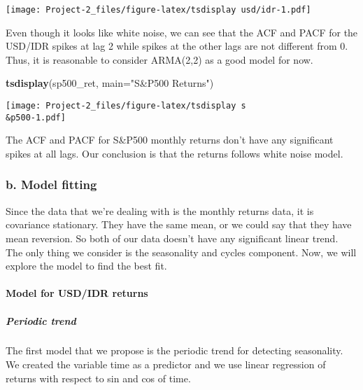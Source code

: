 \documentclass[]{article}
\newenvironment{Shaded}{\begin{snugshade}}{\end{snugshade}}
\newcommand{\KeywordTok}[1]{\textcolor[rgb]{0.13,0.29,0.53}{\textbf{#1}}}
\newcommand{\DataTypeTok}[1]{\textcolor[rgb]{0.13,0.29,0.53}{#1}}
\newcommand{\StringTok}[1]{\textcolor[rgb]{0.31,0.60,0.02}{#1}}
\newcommand{\NormalTok}[1]{#1}
\let\oldparagraph\paragraph
\renewcommand{\paragraph}[1]{\oldparagraph{#1}\mbox{}}
\let\oldsubparagraph\subparagraph
\renewcommand{\subparagraph}[1]{\oldsubparagraph{#1}\mbox{}}
\begin{document}
\texttt{[image: Project-2\_files/figure-latex/tsdisplay usd/idr-1.pdf]}

Even though it looks like white noise, we can see that the ACF and PACF
for the USD/IDR spikes at lag 2 while spikes at the other lags are not
different from 0. Thus, it is reasonable to consider ARMA(2,2) as a good
model for now.

\begin{Shaded}
\begin{Highlighting}[]
\KeywordTok{tsdisplay}\NormalTok{(sp500_ret, }\DataTypeTok{main=}\StringTok{"S&P500 Returns"}\NormalTok{)}
\end{Highlighting}
\end{Shaded}

\texttt{[image: Project-2\_files/figure-latex/tsdisplay s\\\&p500-1.pdf]}

The ACF and PACF for S\&P500 monthly returns don't have any significant
spikes at all lags. Our conclusion is that the returns follows white
noise model.

\subsubsection{b. Model fitting}\label{b.-model-fitting}

Since the data that we're dealing with is the monthly returns data, it
is covariance stationary. They have the same mean, or we could say that
they have mean reversion. So both of our data doesn't have any
significant linear trend. The only thing we consider is the seasonality
and cycles component. Now, we will explore the model to find the best
fit.

\paragraph{Model for USD/IDR returns}\label{model-for-usdidr-returns}

\subparagraph{Periodic trend}\label{periodic-trend}

The first model that we propose is the periodic trend for detecting
seasonality. We created the variable time as a predictor and we use
linear regression of returns with respect to sin and cos of time.
\end{document}
